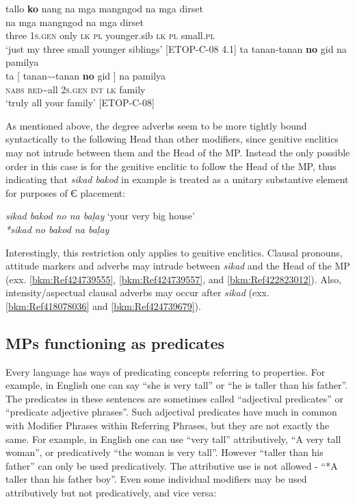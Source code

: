 \ea
\label{bkm:Ref418078298}
tallo  \textbf{ko}  nang  na  mga  mangngod  na  mga  dirset \\\smallskip
   na  mga  mangngod  na  mga  dirset \\
{} three  1\textsc{s.gen}  only {} \textsc{lk}  \textsc{pl}  younger.sib  \textsc{lk}  \textsc{pl}  small.\textsc{pl} \\
\glt ‘just my three small younger siblings’ [ETOP-C-08 4.1]
\z
\ea
\label{bkm:Ref418078380}
ta tanan-tanan  \textbf{no}  gid  na  pamilya \\\smallskip
 \gll ta  [  tanan\sim{}-tanan  \textbf{no}  gid ]  na  pamilya \\
\textsc{nabs} {} \textsc{red}\sim{}all  2\textsc{s.gen}  \textsc{int} {} \textsc{lk}  family \\
\glt ‘truly all your family’ [ETOP-C-08]
\z

As mentioned above, the degree adverbs seem to be more tightly bound syntactically to the following Head than other modifiers, since genitive enclitics may not intrude between them and the Head of the MP. Instead the only possible order in this case is for the genitive enclitic to follow the Head of the MP, thus indicating that \textit{sikad bakod} in example  is treated as a unitary substantive element for purposes of {Є} placement:

\ea
\label{bkm:Ref52474400}
\textit{sikad bakod no na baļay}   ‘your very big house’ \\
\textit{*sikad no bakod na baļay}
\z

Interestingly, this restriction only applies to genitive enclitics. Clausal pronouns, attitude markers and adverbs may intrude between \textit{sikad} and the Head of the MP (exx. \ref{bkm:Ref424739555}, \ref{bkm:Ref424739557}, and \ref{bkm:Ref422823012}). Also, intensity/aspectual clausal adverbs may occur after \textit{sikad} (exx. \ref{bkm:Ref418078036} and \ref{bkm:Ref424739679}).

\subsection{MPs functioning as predicates}
\label{bkm:Ref418108091}

Every language has ways of predicating concepts referring to properties. For example, in English one can say “she is very tall” or “he is taller than his father”. The predicates in these sentences are sometimes called “adjectival predicates” or “predicate adjective phrases”. Such adjectival predicates have much in common with Modifier Phrases within Referring Phrases, but they are not exactly the same. For example, in English one can use “very tall” attributively, “A very tall woman”, or predicatively “the woman is very tall”. However “taller than his father” can only be used predicatively. The attributive use is not allowed  {}- “*A taller than his father boy”. Even some individual modifiers may be used attributively but not predicatively, and vice versa:

